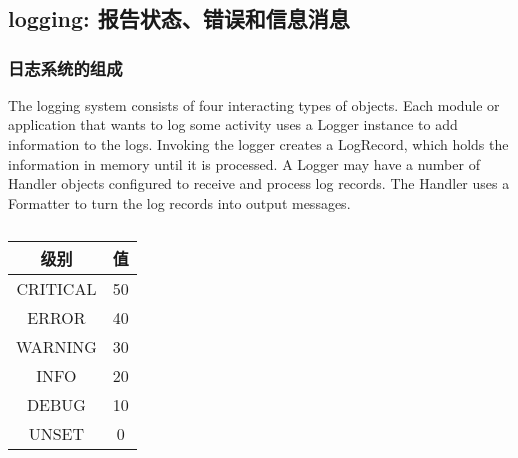 \chapter{\label{ch14}}
\section{logging: 报告状态、错误和信息消息}
\subsection{日志系统的组成}
The logging system consists of four interacting types of objects. Each module or application that wants to log some activity uses a Logger instance to add information to the logs. Invoking the logger creates a LogRecord, which holds the information in memory until it is processed. A Logger may have a number of Handler objects configured to receive and process log records. The Handler uses a Formatter to turn the log records into output messages.

\begin{table}
    \centering
    \caption{}
    \label{日志级别}
    \begin{tabular}{cc}
        \hline
        级别       & 值  \\
        \hline
        CRITICAL & 50 \\
        ERROR    & 40 \\
        WARNING  & 30 \\
        INFO     & 20 \\
        DEBUG    & 10 \\
        UNSET    & 0  \\
        \hline
    \end{tabular}
\end{table}